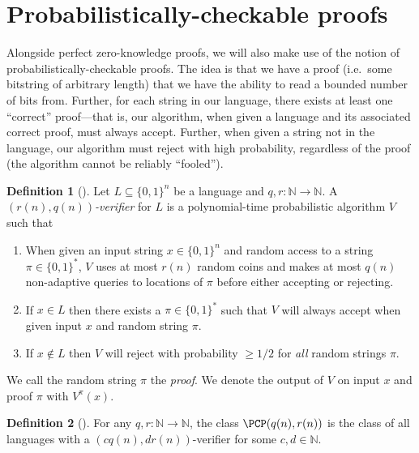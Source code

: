 \documentclass[english]{reedthesis}
\theoremstyle{plain}
\theoremstyle{definition}
\newtheorem{defn}[defn]{Definition}
\theoremstyle{remark}
\begin{document}
\section{Probabilistically-checkable proofs}\label{sec:pcp}

Alongside perfect zero-knowledge proofs, we will also make use of the notion of
probabilistically-checkable proofs. The idea is that we have a proof (i.e.\ some
bitstring of arbitrary length) that we have the ability to read a bounded number
of bits from. Further, for each string in our language, there exists at least
one ``correct'' proof---that is, our algorithm, when given a language and its
associated correct proof, must always accept. Further, when given a string not
in the language, our algorithm must reject with high probability, regardless of
the proof (the algorithm cannot be reliably ``fooled'').

\begin{defn}[{\cite[Def.\ 18.1]{AB09}}]\label{def:prob-check}
  Let $L \subseteq \{0, 1\}^{n}$ be a language and $q, r: \mathbb{N} \rightarrow \mathbb{N}$. A
  \emph{$(r(n), q(n))$-verifier} for $L$ is a polynomial-time probabilistic
  algorithm $V$ such that
  \begin{enumerate}
    \item When given an input string $x \in \{0, 1\}^{n}$ and random access to a
          string $\pi \in \{0, 1\}^{*}$, $V$ uses at most $r(n)$ random coins and
          makes at most $q(n)$ non-adaptive queries to locations of $\pi$ before
          either accepting or rejecting.
    \item If $x \in L$ then there exists a $\pi \in \{0, 1\}^{*}$ such that $V$ will
          always accept when given input $x$ and random string $\pi$.
    \item If $x \notin L$ then $V$ will reject with probability $\ge 1/2$ for
          \emph{all} random strings $\pi$.
  \end{enumerate}
  We call the random string $\pi$ the \emph{proof}. We denote the output of $V$ on
  input $x$ and proof $\pi$ with $V^{\pi}(x)$.
\end{defn}

\begin{defn}[{\cite[Def.\ 18.1]{AB09}}]\label{def:pcp}
  For any $q, r: \mathbb{N} \rightarrow \mathbb{N}$, the class $\PCP(q(n), r(n))$ is the class of all
  languages with a $(cq(n), dr(n))$-verifier for some $c, d \in \mathbb{N}$.
\end{defn}
\end{document}
